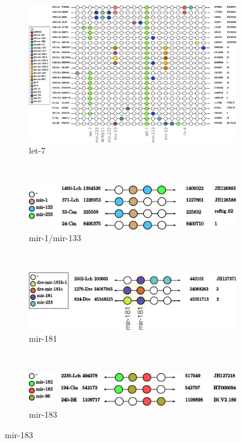 \documentclass[graybox]{svmult}
\begin{document}
\begin{figure}[ht!]
\centering
    \begin{subfigure}[t]{1.0\textwidth}
        \centering
        \includegraphics[height=9 cm]{./Images/Cluster_images/let-7_101_128}
        \caption{let-7}
    \end{subfigure}
    \\
    \begin{subfigure}[t]{0.45\textwidth}
        \centering
        \includegraphics[height=1.2 cm]{./Images/Cluster_images/mir-1_119_33}
        \caption{mir-1/mir-133}
     \end{subfigure}
        ~
     \\
    \begin{subfigure}[t]{0.45\textwidth}
        \centering
        \includegraphics[height=1.2 
cm]{./Images/Cluster_images/mir-181_105_2502}
        \caption{mir-181}
       \end{subfigure}
        ~
         \begin{subfigure}[t]{0.45\textwidth}
        \centering
        \includegraphics[height=1.2 cm]{./Images/Cluster_images/mir-183_132_240}
        \caption{mir-183}
    \end{subfigure}

\end{figure}
\end{document}
